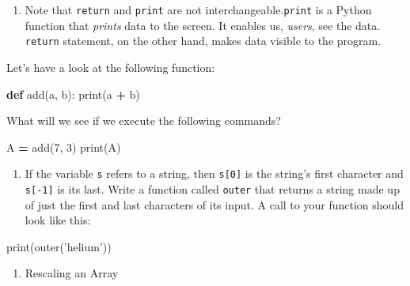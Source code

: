 \documentclass[]{book}
\newenvironment{Shaded}{\begin{snugshade}}{\end{snugshade}}
\newcommand{\BuiltInTok}[1]{#1}
\newcommand{\DecValTok}[1]{\textcolor[rgb]{0.00,0.00,0.81}{#1}}
\newcommand{\KeywordTok}[1]{\textcolor[rgb]{0.13,0.29,0.53}{\textbf{#1}}}
\newcommand{\NormalTok}[1]{#1}
\newcommand{\OperatorTok}[1]{\textcolor[rgb]{0.81,0.36,0.00}{\textbf{#1}}}
\newcommand{\StringTok}[1]{\textcolor[rgb]{0.31,0.60,0.02}{#1}}
\providecommand{\tightlist}{%
  \setlength{\itemsep}{0pt}\setlength{\parskip}{0pt}}
\theoremstyle{definition}
\theoremstyle{definition}
\theoremstyle{definition}
\theoremstyle{remark}
\begin{document}
\begin{enumerate}
\def\labelenumi{\arabic{enumi}.}
\setcounter{enumi}{1}
\tightlist
\item
  Note that \texttt{return} and \texttt{print} are not
  interchangeable.\texttt{print} is a Python function that \emph{prints}
  data to the screen. It enables us, \emph{users}, see the data.
  \texttt{return} statement, on the other hand, makes data visible to
  the program.
\end{enumerate}

Let's have a look at the following function:

\begin{Shaded}
\begin{Highlighting}[]
\KeywordTok{def}\NormalTok{ add(a, b):}
   \BuiltInTok{print}\NormalTok{(a }\OperatorTok{+}\NormalTok{ b)}
\end{Highlighting}
\end{Shaded}

What will we see if we execute the following commands?

\begin{Shaded}
\begin{Highlighting}[]
\NormalTok{A }\OperatorTok{=}\NormalTok{ add(}\DecValTok{7}\NormalTok{, }\DecValTok{3}\NormalTok{)}
\BuiltInTok{print}\NormalTok{(A)}
\end{Highlighting}
\end{Shaded}

\begin{enumerate}
\def\labelenumi{\arabic{enumi}.}
\setcounter{enumi}{2}
\tightlist
\item
  If the variable \texttt{s} refers to a string, then \texttt{s{[}0{]}}
  is the string's first character and \texttt{s{[}-1{]}} is its last.
  Write a function called \texttt{outer} that returns a string made up
  of just the first and last characters of its input. A call to your
  function should look like this:
\end{enumerate}

\begin{Shaded}
\begin{Highlighting}[]
\BuiltInTok{print}\NormalTok{(outer(}\StringTok{'helium'}\NormalTok{))}
\end{Highlighting}
\end{Shaded}

\begin{enumerate}
\def\labelenumi{\arabic{enumi}.}
\setcounter{enumi}{3}
\tightlist
\item
  Rescaling an Array
\end{enumerate}
\end{document}
